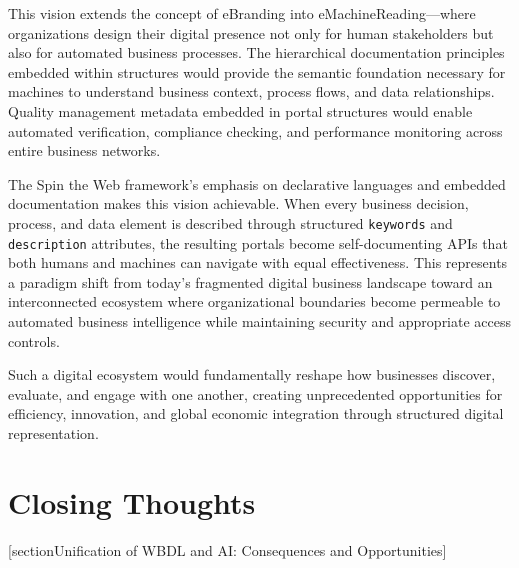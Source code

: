 This vision extends the concept of eBranding into eMachineReading—where organizations design their digital presence not only for human stakeholders but also for automated business processes. The hierarchical documentation principles embedded within \wbdl{} structures would provide the semantic foundation necessary for machines to understand business context, process flows, and data relationships. Quality management metadata embedded in portal structures would enable automated verification, compliance checking, and performance monitoring across entire business networks.

The Spin the Web framework's emphasis on declarative languages and embedded documentation makes this vision achievable. When every business decision, process, and data element is described through structured \texttt{keywords} and \texttt{description} attributes, the resulting portals become self-documenting APIs that both humans and machines can navigate with equal effectiveness. This represents a paradigm shift from today's fragmented digital business landscape toward an interconnected ecosystem where organizational boundaries become permeable to automated business intelligence while maintaining security and appropriate access controls.

Such a digital ecosystem would fundamentally reshape how businesses discover, evaluate, and engage with one another, creating unprecedented opportunities for efficiency, innovation, and global economic integration through structured digital representation.

\section{Closing Thoughts}
[section{Unification of WBDL and AI: Consequences and Opportunities}]

